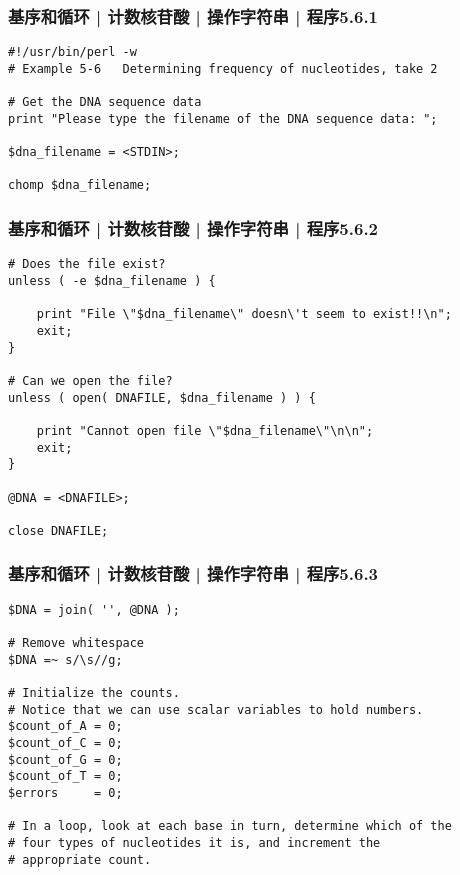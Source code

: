 \begin{frame}[fragile]
  \frametitle{基序和循环 | 计数核苷酸 | 操作字符串 | 程序5.6.1}
\begin{lstlisting}[firstnumber=1]
#!/usr/bin/perl -w
# Example 5-6   Determining frequency of nucleotides, take 2

# Get the DNA sequence data
print "Please type the filename of the DNA sequence data: ";

$dna_filename = <STDIN>;

chomp $dna_filename;
\end{lstlisting}
\end{frame}

\begin{frame}[fragile]
  \frametitle{基序和循环 | 计数核苷酸 | 操作字符串 | 程序5.6.2}
\begin{lstlisting}[firstnumber=11,basicstyle=\footnotesize\tt,numberstyle=\scriptsize]
# Does the file exist?
unless ( -e $dna_filename ) {

    print "File \"$dna_filename\" doesn\'t seem to exist!!\n";
    exit;
}

# Can we open the file?
unless ( open( DNAFILE, $dna_filename ) ) {

    print "Cannot open file \"$dna_filename\"\n\n";
    exit;
}

@DNA = <DNAFILE>;

close DNAFILE;
\end{lstlisting}
\end{frame}

\begin{frame}[fragile]
  \frametitle{基序和循环 | 计数核苷酸 | 操作字符串 | 程序5.6.3}
\begin{lstlisting}[firstnumber=29,basicstyle=\footnotesize\tt,numberstyle=\scriptsize]
$DNA = join( '', @DNA );

# Remove whitespace
$DNA =~ s/\s//g;

# Initialize the counts.
# Notice that we can use scalar variables to hold numbers.
$count_of_A = 0;
$count_of_C = 0;
$count_of_G = 0;
$count_of_T = 0;
$errors     = 0;

# In a loop, look at each base in turn, determine which of the
# four types of nucleotides it is, and increment the
# appropriate count.
\end{lstlisting}
\end{frame}


